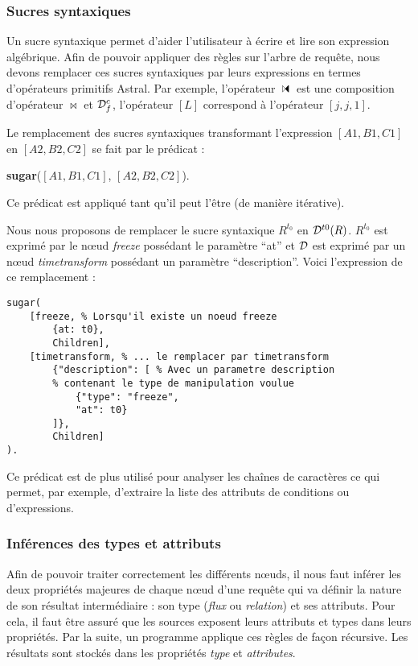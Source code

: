 \subsubsection{Sucres syntaxiques}
Un sucre syntaxique permet d'aider l'utilisateur à écrire et lire son expression algébrique. Afin de pouvoir appliquer des règles sur l'arbre de requête, nous devons remplacer ces sucres syntaxiques par leurs expressions en termes d'opérateurs primitifs Astral. Par exemple, l'opérateur $\ssjoin$ est une composition d'opérateur $\Join$ et $\mathcal{D}_f^c$, l'opérateur $[L]$ correspond à l'opérateur $[j,j,1]$.

\begin{regle}
Le remplacement des sucres syntaxiques transformant l'expression $[A1,B1,C1]$ en $[A2,B2,C2]$ se fait par le prédicat :
\begin{center} \textbf{sugar}($[A1,B1,C1]$, $[A2,B2,C2]$).\end{center}
Ce prédicat est appliqué tant qu'il peut l'être (de manière itérative).
\end{regle}

\begin{example}
	Nous nous proposons de remplacer le sucre syntaxique $R^{t_0}$ en $\mathcal{D}^{t0} (R)$. $R^{t_0}$ est exprimé par le nœud \textit{freeze} possédant le paramètre \enquote{at} et $\mathcal{D}$ est exprimé par un nœud \textit{timetransform} possédant un paramètre \enquote{description}. Voici l'expression de ce remplacement :
	\begin{lstlisting}
sugar(
	[freeze, % Lorsqu'il existe un noeud freeze
		{at: t0},
		Children], 
	[timetransform, % ... le remplacer par timetransform
		{"description": [ % Avec un parametre description
		% contenant le type de manipulation voulue
			{"type": "freeze", 
			"at": t0}
		]},
		Children]
).
	\end{lstlisting}
\end{example}

Ce prédicat est de plus utilisé pour analyser les chaînes de caractères ce qui permet, par exemple, d'extraire la liste des attributs de conditions ou d'expressions.

\subsubsection{Inférences des types et attributs}
Afin de pouvoir traiter correctement les différents nœuds, il nous faut inférer les deux propriétés majeures de chaque nœud d'une requête qui va définir la nature de son résultat intermédiaire : son type (\textit{flux} ou \textit{relation}) et ses attributs. Pour cela, il faut être assuré que les sources exposent leurs attributs et types dans leurs propriétés. Par la suite, un programme applique ces règles de façon récursive. Les résultats sont stockés dans les propriétés \textit{type} et \textit{attributes}.

